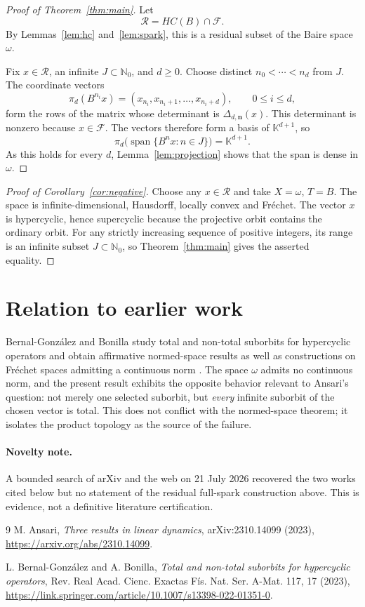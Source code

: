 \documentclass[11pt]{article}
\newcommand{\K}{\mathbb K}
\newcommand{\N}{\mathbb N}
\begin{document}
\begin{proof}[Proof of Theorem~\ref{thm:main}]
Let
\[
  \mathcal R=HC(B)\cap\mathcal F.
\]
By Lemmas~\ref{lem:hc} and~\ref{lem:spark}, this is a residual subset of the
Baire space $\omega$.

Fix $x\in\mathcal R$, an infinite $J\subset\N_0$, and $d\geq0$.  Choose
distinct $n_0<\cdots<n_d$ from $J$.  The coordinate vectors
\[
  \pi_d(B^{n_i}x)=(x_{n_i},x_{n_i+1},\ldots,x_{n_i+d}),
  \qquad 0\leq i\leq d,
\]
form the rows of the matrix whose determinant is
$\Delta_{d,\mathbf n}(x)$.  This determinant is nonzero because
$x\in\mathcal F$.  The vectors therefore form a basis of $\K^{d+1}$, so
\[
 \pi_d\bigl(\operatorname{span}\{B^n x:n\in J\}\bigr)=\K^{d+1}.
\]
As this holds for every $d$, Lemma~\ref{lem:projection} shows that the span is
dense in $\omega$.
\end{proof}

\begin{proof}[Proof of Corollary~\ref{cor:negative}]
Choose any $x\in\mathcal R$ and take $X=\omega$, $T=B$.  The space is
infinite-dimensional, Hausdorff, locally convex and Fr\'echet.  The vector
$x$ is hypercyclic, hence supercyclic because the projective orbit contains
the ordinary orbit.  For any strictly increasing sequence of positive
integers, its range is an infinite subset $J\subset\N_0$, so
Theorem~\ref{thm:main} gives the asserted equality.
\end{proof}

\section{Relation to earlier work}

Bernal-Gonz\'alez and Bonilla study total and non-total suborbits for
hypercyclic operators and obtain affirmative normed-space results as well as
constructions on Fr\'echet spaces admitting a continuous norm
\cite{BernalBonilla}.  The space $\omega$ admits no continuous norm, and the
present result exhibits the opposite behavior relevant to Ansari's
question: not merely one selected suborbit, but \emph{every} infinite
suborbit of the chosen vector is total.  This does not conflict with the
normed-space theorem; it isolates the product topology as the source of the
failure.

\paragraph{Novelty note.}
A bounded search of arXiv and the web on 21 July 2026 recovered the two works
cited below but no statement of the residual full-spark construction above.
This is evidence, not a definitive literature certification.

\begin{thebibliography}{9}
M. Ansari,
\emph{Three results in linear dynamics},
arXiv:2310.14099 (2023),
\url{https://arxiv.org/abs/2310.14099}.

L. Bernal-Gonz\'alez and A. Bonilla,
\emph{Total and non-total suborbits for hypercyclic operators},
Rev. Real Acad. Cienc. Exactas F\'is. Nat. Ser. A-Mat. 117, 17 (2023),
\url{https://link.springer.com/article/10.1007/s13398-022-01351-0}.
\end{thebibliography}
\end{document}
